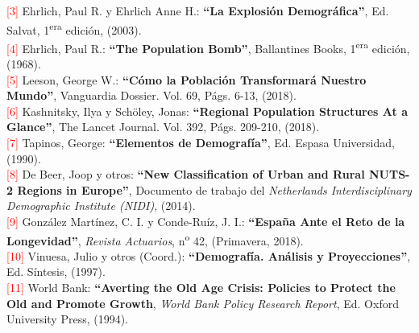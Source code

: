 \vspace{-0.23cm}
\noindent \textcolor{red}{[3]} Ehrlich, Paul R. y Ehrlich Anne H.: \textbf{``La Explosi\'on Demogr\'afica''}, Ed. Salvat, 1\textsuperscript{era} edici\'on, (2003).\\

\vspace{-0.23cm}
\noindent \textcolor{red}{[4]} Ehrlich, Paul R.: \textbf{``The Population Bomb''}, Ballantines Books, 1\textsuperscript{era} edici\'on, (1968).\\

\vspace{-0.23cm}
\noindent \textcolor{red}{[5]} Leeson, George W.: \textbf{``C\'omo la Poblaci\'on Transformar\'a Nuestro Mundo''}, Vanguardia Dossier. Vol. 69, P\'ags. 6-13, (2018).\\

\vspace{-0.23cm}
\noindent \textcolor{red}{[6]} Kashnitsky, Ilya y Sch\"oley, Jonas: \textbf{``Regional Population Structures At a Glance''}, The Lancet Journal. Vol. 392, P\'ags. 209-210, (2018).\\

\vspace{-0.23cm}
\noindent \textcolor{red}{[7]} Tapinos, George: \textbf{``Elementos de Demograf\'ia''}, Ed. Espasa Universidad, (1990).\\

\vspace{-0.23cm}
\noindent \textcolor{red}{[8]} De Beer, Joop y otros: \textbf{``New Classification of Urban and Rural NUTS-2 Regions in Europe''}, Documento de trabajo del \textit{Netherlands Interdisciplinary Demographic Institute (NIDI)}, (2014).\\

\vspace{-0.23cm}
\noindent \textcolor{red}{[9]} González Martínez, C. I. y Conde-Ruíz, J. I.: \textbf{``España Ante el Reto de la Longevidad''}, \textit{Revista Actuarios}, n\textsuperscript{o} 42, (Primavera, 2018).\\

\vspace{-0.23cm}
\noindent \textcolor{red}{[10]} Vinuesa, Julio y otros (Coord.): \textbf{``Demograf\'ia. An\'alisis y Proyecciones''}, Ed. S\'intesis, (1997).\\

\vspace{-0.23cm}
\noindent \textcolor{red}{[11]} World Bank: \textbf{``Averting the Old Age Crisis: Policies to Protect the Old and Promote Growth}, \textit{World Bank Policy Research Report}, Ed. Oxford University Press, (1994).\\

